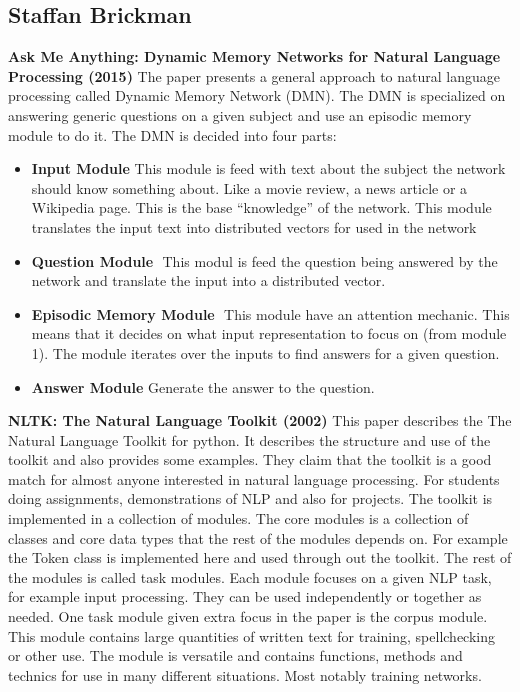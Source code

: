 \subsection{Staffan Brickman}
\textbf{Ask Me Anything: Dynamic Memory Networks for Natural Language Processing (2015)}
\newline
The paper presents a general approach to natural language processing called Dynamic Memory Network (DMN). The DMN is specialized on answering generic questions on a given subject and use an episodic memory module to do it. The DMN is decided into four parts:
\begin{itemize}
\item \textbf{Input Module} \newline This module is feed with text about the subject the network should know something about. Like a movie review, a news article or a Wikipedia page. This is the base “knowledge” of the network. This module translates the input text into distributed vectors for used in the network
\item \textbf{Question Module} \newline This modul is feed the question being answered by the network and translate the input into a distributed vector.
\item \textbf{Episodic Memory Module} \newline This module have an attention mechanic. This means that it decides on what input representation to focus on (from module 1). The module iterates over the inputs to find answers for a given question.
\item \textbf{Answer Module} \newline Generate the answer to the question.
\end{itemize}
\textbf{NLTK: The Natural Language Toolkit (2002)}
\newline
This paper describes the The Natural Language Toolkit for python. It describes the structure and use of the toolkit and also provides some examples. They claim that the toolkit is a good match for almost anyone interested in natural language processing. For students doing assignments, demonstrations of NLP and also for projects.
The toolkit is implemented in a collection of modules. The core modules is a collection of classes and core data types that the rest of the modules depends on. For example the Token class is implemented here and used through out the toolkit. The rest of the modules is called task modules. Each module focuses on a given NLP task, for example input processing. They can be used independently or together as needed. One task module given extra focus in the paper is the corpus module. This module contains large quantities  of written text for training, spellchecking or other use. The module is versatile and contains functions, methods and technics for use in many different situations. Most notably training networks. 
